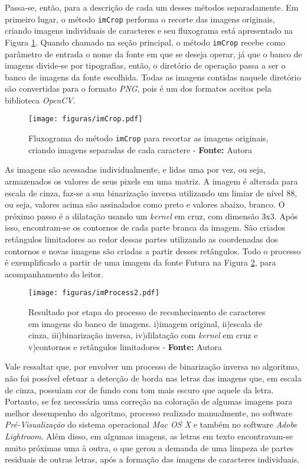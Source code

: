 Passa-se, então, para a descrição de cada um desses métodos separadamente. Em primeiro lugar, o método \texttt{imCrop} performa o recorte das imagens originais, criando imagens individuais de caracteres e seu fluxograma está apresentado na Figura \ref{fig:flowimCrop}. Quando chamado na seção principal, o método \texttt{imCrop} recebe como parâmetro de entrada o nome da fonte em que se deseja operar, já que o banco de imagens divide-se por tipografias, então, o diretório de operação passa a ser o banco de imagens da fonte escolhida. Todas as imagens contidas naquele diretório são convertidas para o formato \textit{PNG}, pois é um dos formatos aceitos pela biblioteca \textit{OpenCV}.


\begin{figure}[H]
  \centering
  \texttt{[image: figuras/imCrop.pdf]}
  \caption{Fluxograma do método \texttt{imCrop} para recortar as imagens originais, criando imagens separadas de cada caractere  - \textbf{Fonte:} Autora}
  \label{fig:flowimCrop}
\end{figure}

As imagens são acessadas individualmente, e lidas uma por vez, ou seja, armazenados os valores de seus pixels em uma matriz. A imagem é alterada para escala de cinza, faz-se a sua binarização inversa utilizando um limiar de nível 88, ou seja, valores acima são assinalados como preto e valores abaixo, branco. O próximo passo é a dilatação usando um \textit{kernel} em cruz, com dimensão 3x3. Após isso, encontram-se os contornos de cada parte branca da imagem. São criados retângulos limitadores ao redor dessas partes utilizando as coordenadas dos contornos e novas imagens são criadas a partir desses retângulos. Todo o processo é exemplificado a partir de uma imagem da fonte Futura na Figura \ref{fig:imProcess}, para acompanhamento do leitor.

\begin{figure}[H]
  \centering
  \texttt{[image: figuras/imProcess2.pdf]}
  \caption{Resultado por etapa do processo de reconhecimento de caracteres em imagens do banco de imagens. i)imagem original, ii)escala de cinza, iii)binarização inversa, iv)dilatação com \textit{kernel} em cruz e v)contornos e retângulos limitadores - \textbf{Fonte:} Autora}
  \label{fig:imProcess}
\end{figure}

Vale ressaltar que, por envolver um processo de binarização inversa no algoritmo, não foi possível efetuar a detecção de borda nas letras das imagens que, em escala de cinza, possuíam cor de fundo com tom mais escuro que aquele da letra. Portanto, se fez necessária uma correção na coloração de algumas imagens para melhor desempenho do algoritmo, processo realizado manualmente, no software \textit{Pré-Visualização} do sistema operacional \textit{Mac OS X} e também no software \textit{Adobe Lightroom}. Além disso, em algumas imagens, as letras em texto encontravam-se muito próximas uma à outra, o que gerou a demanda de uma limpeza de partes residuais de outras letras, após a formação das imagens de caracteres individuais.

